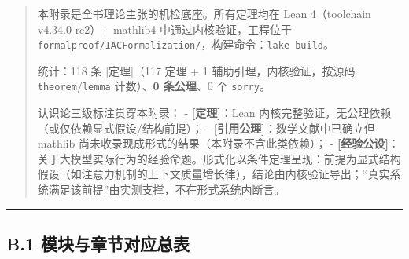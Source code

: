 \documentclass[
]{ctexart}
\renewcommand{\_}{\discretionary{}{}{\textunderscore}}
\begin{document}
\begin{quote}
本附录是全书理论主张的机检底座。所有定理均在 Lean 4（toolchain
v4.34.0-rc2）+ mathlib4 中通过内核验证，工程位于
\texttt{formal\_proof/IACFormalization/}，构建命令：\texttt{lake\ build}。

统计：118 条 {[}定理{]}（117 定理 + 1 辅助引理，内核验证，按源码
\texttt{theorem}/\texttt{lemma} 计数）、\textbf{0 条公理}、0 个
\texttt{sorry}。

认识论三级标注贯穿本附录： - \textbf{{[}定理{]}}：Lean
内核完整验证，无公理依赖（或仅依赖显式假设/结构前提）； -
\textbf{{[}引用公理{]}}：数学文献中已确立但 mathlib
尚未收录现成形式的结果（本附录不含此类依赖）； -
\textbf{{[}经验公设{]}}：关于大模型实际行为的经验命题。形式化以条件定理呈现：前提为显式结构假设（如注意力机制的上下文质量增长律），结论由内核验证导出；``真实系统满足该前提''由实测支撑，不在形式系统内断言。
\end{quote}

\begin{center}\rule{0.5\linewidth}{0.5pt}\end{center}

\subsection{B.1
模块与章节对应总表}\label{b.1-ux6a21ux5757ux4e0eux7ae0ux8282ux5bf9ux5e94ux603bux8868}
\end{document}
